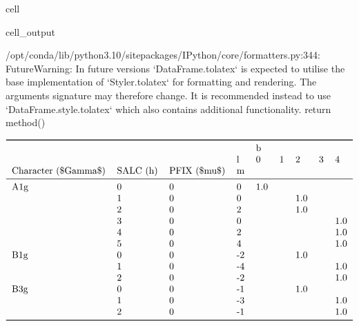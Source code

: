 \documentclass[letterpaper,table,10pt,english]{jupyterBook}
\begin{document}
\begin{sphinxuseclass}{cell}
\begin{sphinxVerbatimOutput}
\begin{sphinxuseclass}{cell_output}
\begin{sphinxVerbatim}[commandchars=\\\{\}]
/opt/conda/lib/python3.10/site\PYGZhy{}packages/IPython/core/formatters.py:344: FutureWarning: In future versions `DataFrame.to\PYGZus{}latex` is expected to utilise the base implementation of `Styler.to\PYGZus{}latex` for formatting and rendering. The arguments signature may therefore change. It is recommended instead to use `DataFrame.style.to\PYGZus{}latex` which also contains additional functionality.
  return method()
\end{sphinxVerbatim}
\begin{equation*}
\begin{split}\begin{tabular}{lllllllll}
\toprule
    &   &   & {} & \multicolumn{5}{l}{b} \\
    &   &   & l &    0 & 1 &    2 & 3 &    4 \\
Character (\$\textbackslash Gamma\$) & SALC (h) & PFIX (\$\textbackslash mu\$) & m &      &   &      &   &      \\
\midrule
A1g & 0 & 0 &  0 &  1.0 &   &      &   &      \\
    & 1 & 0 &  0 &      &   &  1.0 &   &      \\
    & 2 & 0 &  2 &      &   &  1.0 &   &      \\
    & 3 & 0 &  0 &      &   &      &   &  1.0 \\
    & 4 & 0 &  2 &      &   &      &   &  1.0 \\
    & 5 & 0 &  4 &      &   &      &   &  1.0 \\
B1g & 0 & 0 & -2 &      &   &  1.0 &   &      \\
    & 1 & 0 & -4 &      &   &      &   &  1.0 \\
    & 2 & 0 & -2 &      &   &      &   &  1.0 \\
B3g & 0 & 0 & -1 &      &   &  1.0 &   &      \\
    & 1 & 0 & -3 &      &   &      &   &  1.0 \\
    & 2 & 0 & -1 &      &   &      &   &  1.0 \\
\bottomrule
\end{tabular}\end{split}
\end{equation*}
\end{sphinxuseclass}\end{sphinxVerbatimOutput}

\end{sphinxuseclass}
\sphinxstepscope
\end{document}
